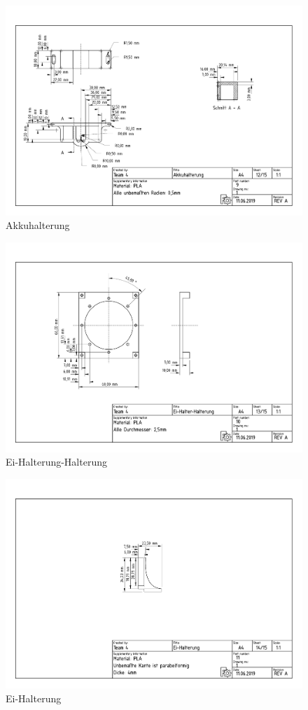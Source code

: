 \begin{figure}[ht!]
	\includegraphics[width=\textwidth]{../techzeich/9.PDF} 	
	\caption{Akkuhalterung}
\end{figure}
\begin{figure}[ht!]
	\includegraphics[width=\textwidth]{../techzeich/10.PDF} 	
	\caption{Ei-Halterung-Halterung}
\end{figure}
\begin{figure}[ht!]
	\includegraphics[width=\textwidth]{../techzeich/11.PDF} 	
	\caption{Ei-Halterung}
\end{figure}
